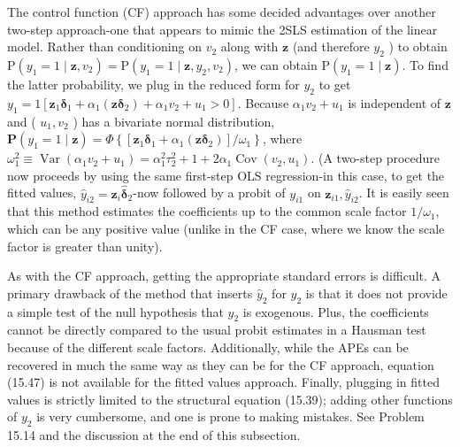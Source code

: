 \documentclass[10pt]{article}
\begin{document}
The control function (CF) approach has some decided advantages over another two-step approach-one that appears to mimic the 2SLS estimation of the linear model. Rather than conditioning on $v_{2}$ along with $\mathbf{z}$ (and therefore $y_{2}$ ) to obtain $\mathrm{P}\left(y_{1}=1 \mid \mathbf{z}, v_{2}\right)=\mathrm{P}\left(y_{1}=1 \mid \mathbf{z}, y_{2}, v_{2}\right)$, we can obtain $\mathrm{P}\left(y_{1}=1 \mid \mathbf{z}\right)$. To find the latter probability, we plug in the reduced form for $y_{2}$ to get $y_{1}=1\left[\mathbf{z}_{1} \boldsymbol{\delta}_{1}+\alpha_{1}\left(\mathbf{z} \boldsymbol{\delta}_{2}\right)+\alpha_{1} v_{2}+\right. \left.u_{1}>0\right]$. Because $\alpha_{1} v_{2}+u_{1}$ is independent of $\mathbf{z}$ and ( $u_{1}, v_{2}$ ) has a bivariate normal distribution, $\mathbf{P}\left(y_{1}=1 \mid \mathbf{z}\right)=\Phi\left\{\left[\mathbf{z}_{1} \boldsymbol{\delta}_{1}+\alpha_{1}\left(\mathbf{z} \boldsymbol{\delta}_{2}\right)\right] / \omega_{1}\right\}$, where $\omega_{1}^{2} \equiv \operatorname{Var}\left(\alpha_{1} v_{2}+u_{1}\right)= \alpha_{1}^{2} \tau_{2}^{2}+1+2 \alpha_{1} \operatorname{Cov}\left(v_{2}, u_{1}\right)$. (A two-step procedure now proceeds by using the same first-step OLS regression-in this case, to get the fitted values, $\hat{y}_{i 2}=\mathbf{z}_{i} \hat{\boldsymbol{\delta}}_{2}$-now followed by a probit of $y_{i 1}$ on $\mathbf{z}_{i 1}, \hat{y}_{i 2}$. It is easily seen that this method estimates the coefficients up to the common scale factor $1 / \omega_{1}$, which can be any positive value (unlike in the CF case, where we know the scale factor is greater than unity).

As with the CF approach, getting the appropriate standard errors is difficult. A primary drawback of the method that inserts $\hat{y}_{2}$ for $y_{2}$ is that it does not provide a simple test of the null hypothesis that $y_{2}$ is exogenous. Plus, the coefficients cannot be directly compared to the usual probit estimates in a Hausman test because of the different scale factors. Additionally, while the APEs can be recovered in much the same way as they can be for the CF approach, equation (15.47) is not available for the fitted values approach. Finally, plugging in fitted values is strictly limited to the structural equation (15.39); adding other functions of $y_{2}$ is very cumbersome, and one is prone to making mistakes. See Problem 15.14 and the discussion at the end of this subsection.
\end{document}
